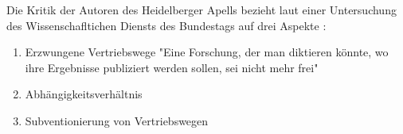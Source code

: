Die Kritik der Autoren des Heidelberger Apells bezieht laut einer Untersuchung des Wissenschafltichen Diensts des Bundestags auf drei Aspekte \cite{WD_bundestag_2009}:
\begin{enumerate}
\item Erzwungene Vertriebswege
"Eine Forschung, der man diktieren könnte, wo ihre Ergebnisse publiziert werden sollen, sei nicht mehr frei"
\item Abhängigkeitsverhältnis
\item Subventionierung von Vertriebswegen
\end{enumerate}

